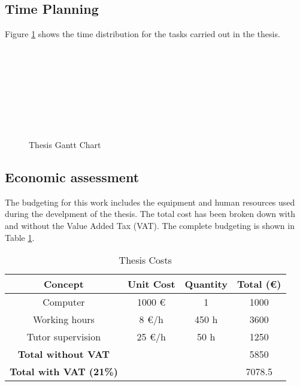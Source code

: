 \documentclass[a4paper,11pt, titlepage, twoside]{article}
\begin{document}
\subsection{Time Planning}

Figure \ref{fig:gantt} shows the time distribution for the tasks carried out in the thesis.
\begin{figure}[h]
\begin{center}
\begin{ganttchart}{1}{20}
     \\
         \\
     \\
     \\
     \\
     \\
     \\
\end{ganttchart}
\caption{Thesis Gantt Chart}
\label{fig:gantt}
\end{center}
\end{figure}

\subsection{Economic assessment}

The budgeting for this work includes the equipment and human resources used during the develpment of the thesis.
The total cost has been broken down with and without the Value Added Tax (VAT). The complete budgeting is shown in Table 
\ref{tab:costs}.
\begin{table}[h]
\centering
\begin{tabular}{c c c c}
\hline
\textbf{Concept} & \textbf{ Unit Cost} & \textbf{Quantity} & \textbf{ Total (\euro)} \\
\hline
Computer & 1000 \euro & 1 & 1000\\
Working hours & 8 \euro/h  & 450 h & 3600 \\
Tutor supervision & 25 \euro/h   &  50 h & 1250 \\
\hline
\textbf{Total without VAT} & & & 5850 \\
\hline
\textbf{Total with VAT (21\%)} & & &  7078.5 \\
\hline
\end{tabular}
\caption{Thesis Costs}
\label{tab:costs}
\end{table}
\end{document}
